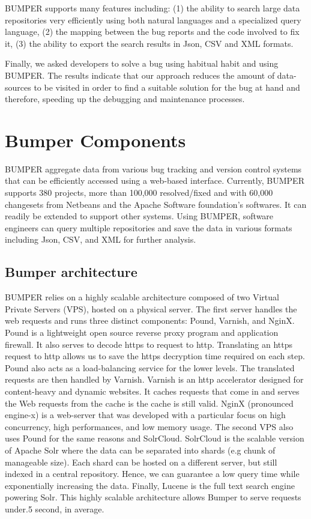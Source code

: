 \documentclass[conference]{IEEEtran}
\begin{document}
BUMPER supports many features including: (1) the ability to search large data repositories very efficiently using both natural languages and a specialized query language, (2) the mapping between the bug reports and the code involved to fix it, (3) the ability to export the search results in Json, CSV and XML formats.

Finally, we asked developers to solve a bug using habitual habit and using BUMPER. The results indicate that our approach reduces the amount of data-sources to be visited in order to find a suitable solution for the bug at hand and therefore, speeding up the debugging and maintenance processes.

\section{Bumper Components}
\label{sec:Bumper Components}

BUMPER aggregate data from various bug tracking and version control systems that can be efficiently accessed using a web-based interface.
Currently, BUMPER supports 380 projects, more than 100,000 resolved/fixed and with 60,000 changesets from Netbeans and the Apache Software foundation’s softwares.
It can readily be extended to support other systems.
Using BUMPER, software engineers can query multiple repositories and save the data in various formats including Json, CSV, and XML for further analysis.

\subsection{Bumper architecture}
\label{sub:Bumper architecture}


BUMPER relies on a highly scalable architecture composed
of two Virtual Private Servers (VPS), hosted on a physical
server.
The first server handles the web requests and
runs three distinct components: Pound, Varnish, and NginX.
Pound is a lightweight open source reverse proxy program
and application firewall.
It also serves to decode https to request to http.
Translating an https request to http allows us to save the https decryption time required on each step.
Pound also acts as a load-balancing service for the lower levels.
The translated requests are then handled by Varnish.
Varnish is an http accelerator designed for content-heavy and dynamic websites.
It caches requests that come in and serves the Web requests from the cache is the cache is still valid.
NginX (pronounced engine-x) is a web-server that was developed with a particular focus on high concurrency, high performances, and low memory usage.
The second VPS also uses Pound for the same reasons and SolrCloud.
SolrCloud is the scalable version of Apache Solr where the data can be separated into shards (e.g chunk of manageable size).
Each shard can be hosted on a different server, but still indexed in a central repository.
Hence, we can guarantee a low query time while exponentially increasing the data.
Finally, Lucene is the full text search engine powering Solr.
This highly scalable architecture allows Bumper to serve requests under.5 second, in average.
\end{document}
